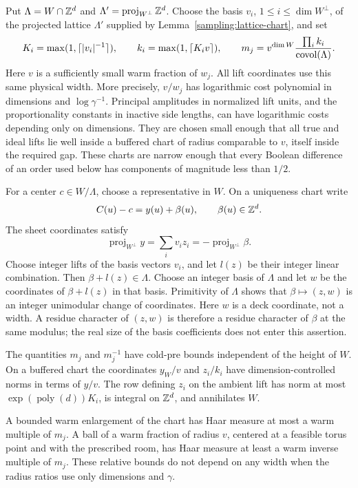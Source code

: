 Put $\Lambda=W\cap\mathbb Z^d$ and
$\Lambda'=\operatorname{proj}_{W^\perp}\mathbb Z^d$.
Choose the basis $v_i$, $1\le i\le\dim W^\perp$, of the projected
lattice $\Lambda'$ supplied by Lemma~\ref{sampling:lattice-chart},
and set
\begin{equation}\label{ap:path:mass}
 K_i=\max(1,\lceil |v_i|^{-1}\rceil),\qquad
 k_i=\max(1,\lceil K_i v\rceil),
 \qquad
 m_j=v^{\dim W}\frac{\prod_i k_i}{\operatorname{covol}(\Lambda)}.
\end{equation}
Here $v$ is a sufficiently small warm fraction of $w_j$.  All lift
coordinates use this same physical width.  More precisely, $v/w_j$ has
logarithmic cost polynomial in dimensions and $\log\gamma^{-1}$.
Principal amplitudes in normalized lift units, and the proportionality
constants in inactive side lengths, can have logarithmic costs depending
only on dimensions.  They are chosen small enough that all true and
ideal lifts lie well inside a buffered chart of radius comparable to
$v$, itself inside the required gap.  These charts are narrow enough
that every Boolean difference of an order used below has components
of magnitude less than $1/2$.

For a center $c\in W/\Lambda$, choose a representative in $W$.  On a
uniqueness chart write
\[
 C(u)-c=y(u)+\beta(u),\qquad \beta(u)\in\mathbb Z^d.
\]
The sheet coordinates satisfy
\[
 \operatorname{proj}_{W^\perp}y=\sum_i v_i z_i
       =-\operatorname{proj}_{W^\perp}\beta.
\]
Choose integer lifts of the basis vectors $v_i$, and let $l(z)$
be their integer linear combination. Then $\beta+l(z)\in\Lambda$.
Choose an integer basis of $\Lambda$ and let $w$ be the coordinates
of $\beta+l(z)$ in that basis. Primitivity of $\Lambda$ shows that
$\beta\mapsto(z,w)$ is an integer unimodular change of coordinates.
Here $w$ is a deck coordinate, not a width. A residue character of
$(z,w)$ is therefore a residue character of $\beta$ at the same
modulus; the real size of the basis coefficients does not enter
this assertion.

\begin{lemma}\label{ap:path:chart}
The quantities $m_j$ and $m_j^{-1}$ have cold-pre bounds independent of
the height of $W$.  On a buffered chart the coordinates
$y_W/v$ and $z_i/k_i$ have dimension-controlled norms in terms of $y/v$.
The row defining $z_i$ on the ambient lift has norm at most
$\exp(\operatorname{poly}(d))K_i$, is integral on $\mathbb Z^d$, and
annihilates $W$.

A bounded warm enlargement of the chart has Haar measure at most a
warm multiple of $m_j$.  A ball of a warm fraction of radius $v$,
centered at a feasible torus point and with the prescribed room, has
Haar measure at least a warm inverse multiple of $m_j$.  These relative
bounds do not depend on any width when the radius ratios use only
dimensions and $\gamma$.
\end{lemma}

